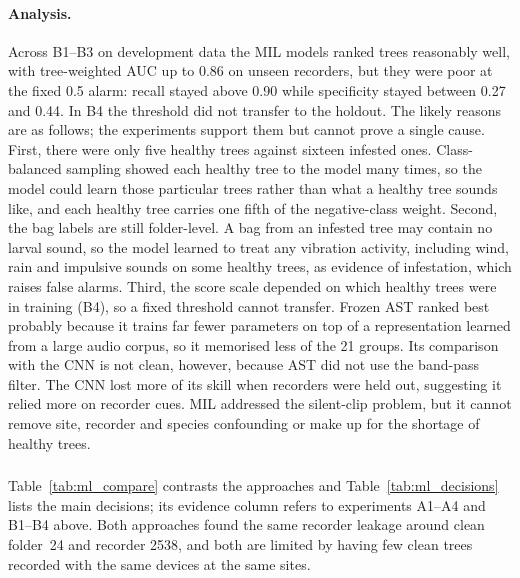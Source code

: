 \paragraph{Analysis.} Across B1--B3 on development data the MIL models ranked trees reasonably well, with tree-weighted AUC up to 0.86 on unseen recorders, but they were poor at the fixed 0.5 alarm: recall stayed above 0.90 while specificity stayed between 0.27 and 0.44. In B4 the threshold did not transfer to the holdout. The likely reasons are as follows; the experiments support them but cannot prove a single cause. First, there were only five healthy trees against sixteen infested ones. Class-balanced sampling showed each healthy tree to the model many times, so the model could learn those particular trees rather than what a healthy tree sounds like, and each healthy tree carries one fifth of the negative-class weight. Second, the bag labels are still folder-level. A bag from an infested tree may contain no larval sound, so the model learned to treat any vibration activity, including wind, rain and impulsive sounds on some healthy trees, as evidence of infestation, which raises false alarms. Third, the score scale depended on which healthy trees were in training (B4), so a fixed threshold cannot transfer. Frozen AST ranked best probably because it trains far fewer parameters on top of a representation learned from a large audio corpus, so it memorised less of the 21 groups. Its comparison with the CNN is not clean, however, because AST did not use the band-pass filter. The CNN lost more of its skill when recorders were held out, suggesting it relied more on recorder cues. MIL addressed the silent-clip problem, but it cannot remove site, recorder and species confounding or make up for the shortage of healthy trees.

\subsubsection{}
\label{sec:ml_compare}
Table~\ref{tab:ml_compare} contrasts the approaches and Table~\ref{tab:ml_decisions} lists the main decisions; its evidence column refers to experiments A1--A4 and B1--B4 above. Both approaches found the same recorder leakage around clean folder~24 and recorder 2538, and both are limited by having few clean trees recorded with the same devices at the same sites.


